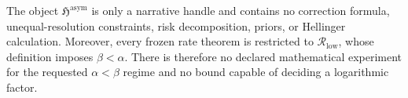 The object \(\mathfrak H^{\mathrm{asym}}\) is only a narrative handle and contains no correction formula, unequal-resolution constraints, risk decomposition, priors, or Hellinger calculation.  Moreover, every frozen rate theorem is restricted to \(\mathcal R_{\mathrm{low}}\), whose definition imposes \(\beta<\alpha\).  There is therefore no declared mathematical experiment for the requested \(\alpha<\beta\) regime and no bound capable of deciding a logarithmic factor.